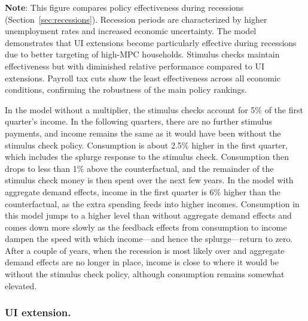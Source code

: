 \documentclass[qe,draft]{econsocart}
\theoremstyle{plain}
\theoremstyle{definition}
\begin{document}
\noindent\parbox{\textwidth}{\footnotesize
  \textbf{Note}: This figure compares policy effectiveness during recessions (Section~\ref{sec:recessions}).
  Recession periods are characterized by higher unemployment rates and increased economic uncertainty.
  The model demonstrates that UI extensions become particularly effective during recessions due to
  better targeting of high-MPC households. Stimulus checks maintain effectiveness but with diminished
  relative performance compared to UI extensions. Payroll tax cuts show the least effectiveness
  across all economic conditions, confirming the robustness of the main policy rankings.
}

\vspace{1em}
\FloatBarrier %

In the model without a multiplier, the stimulus checks account for 5\% of the first quarter's income.
In the following quarters, there are no further stimulus payments, and income remains the same as it would have been without the stimulus check policy.
Consumption is about 2.5\% higher in the first quarter, which includes the splurge response to the stimulus check.
Consumption then drops to less than 1\% above the counterfactual, and the remainder of the stimulus check money is then spent over the next few years.
In the model with aggregate demand effects, income in the first quarter is 6\% higher than the counterfactual, as the extra spending feeds into higher incomes.
Consumption in this model jumps to a higher level than without aggregate demand effects and comes down more slowly as the feedback effects from consumption to income dampen the speed with which income---and hence the splurge---return to zero.
After a couple of years, when the recession is most likely over and aggregate demand effects are no longer in place, income is close to where it would be without the stimulus check policy, although consumption remains somewhat elevated.

\subsubsection{UI extension.}
\end{document}

